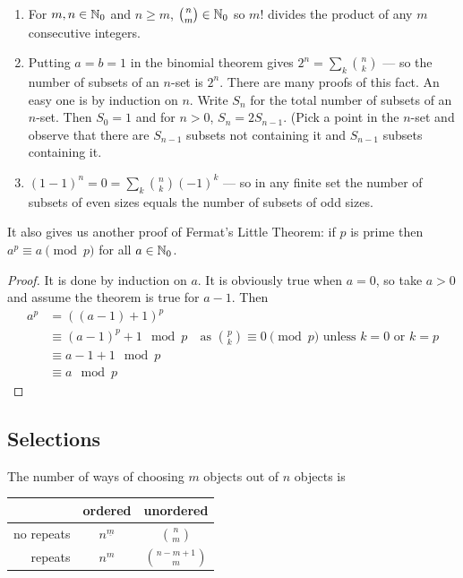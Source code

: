 \documentclass{notes}
\theoremstyle{plain}
\begin{document}
\begin{enumerate}
\item For $m,n \in \mathbb{N}_0$ and $n \ge m$, $\binom{n}{m} \in \mathbb{N}_0$ so
$m!$ divides the product of any $m$ consecutive integers.
\item Putting $a=b=1$ in the binomial theorem gives $2^n =
\sum_k \binom{n}{k}$ --- so the number of subsets of an $n$-set is $2^n$.
There are many proofs of this fact.  An easy one is by induction on $n$.
Write $S_n$ for the total number of subsets of an $n$-set.  Then $S_0 = 1$
and for $n > 0$, $S_n = 2 S_{n-1}$.  (Pick a point in the $n$-set and
observe that there are $S_{n-1}$ subsets not containing it and $S_{n-1}$
subsets containing it.
\item $(1-1)^n = 0 = \sum_k \binom{n}{k} (-1)^k$ --- so in any finite set
the number of subsets of even sizes equals the number of subsets of odd sizes.
\end{enumerate}

It also gives us another proof of Fermat's Little Theorem: if $p$ is prime
then $a^p \equiv a \pmod{p}$ for all $a \in \mathbb{N}_0$.

\begin{proof}
It is done by induction on $a$.  It is obviously true when $a = 0$, so
take $a > 0$ and assume the theorem is true for $a-1$.  Then
\begin{align*}
a^p &= \left( \left( a-1 \right) + 1 \right)^p \\
&\equiv \left( a-1 \right)^p + 1 \mod{p} \quad \text{as $\binom{p}{k} \equiv
0 \pmod{p}$ unless $k=0$ or $k=p$} \\
&\equiv a - 1 + 1 \mod{p}\\
&\equiv a \mod{p}
\end{align*}
\end{proof}

\subsection{Selections}

The number of ways of choosing $m$ objects out of $n$ objects is

\begin{center}
\begin{tabular}{r | c c}
  & ordered & unordered \\ \hline
no repeats & $n^{\underline{m}}$ &  $\binom{n}{m}$ \\
repeats & $n^m$ & $\binom{n-m+1}{m}$
\end{tabular}
\end{center}
\end{document}
